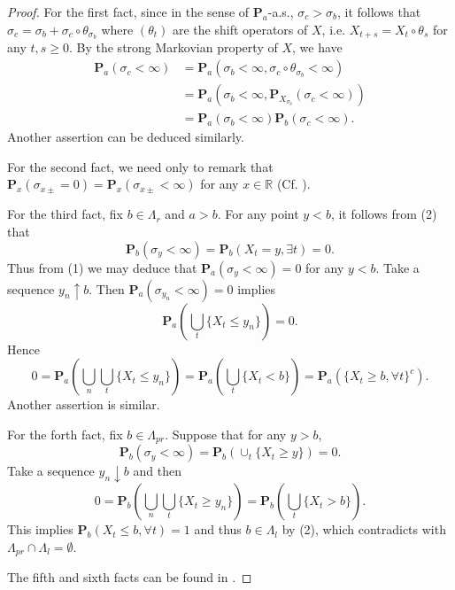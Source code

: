 \documentclass[a4paper]{amsart}
\theoremstyle{definition}
\theoremstyle{remark}
\numberwithin{equation}{section}
\begin{document}
\begin{proof}
For the first fact, since in the sense of $\mathbf{P}_a$-a.s., $\sigma_c>\sigma_b$, it follows that $\sigma_c=\sigma_b+\sigma_c\circ \theta_{\sigma_b}$ where $(\theta_t)$ are the shift operators of $X$, i.e. $X_{t+s}=X_t\circ \theta_s$ for any $t,s\geq 0$. By the strong Markovian property of $X$, we have
\[
\begin{aligned}
\mathbf{P}_a(\sigma_c<\infty)&= \mathbf{P}_a(\sigma_b<\infty, \sigma_c\circ \theta_{\sigma_b}<\infty)\\
&=\mathbf{P}_a(\sigma_b<\infty, \mathbf{P}_{X_{\sigma_b}}(\sigma_c<\infty))\\
&=\mathbf{P}_a(\sigma_b<\infty)\mathbf{P}_b(\sigma_c<\infty).
\end{aligned}
\]
Another assertion can be deduced similarly.

For the second fact, we need only to remark that $\mathbf{P}_x(\sigma_{x\pm}=0)=\mathbf{P}_x(\sigma_{x\pm}<\infty)$ for any $x\in \mathbb{R}$ (Cf. \cite[\S3.3, 10a)]{IM74}).

For the third fact, fix $b\in \Lambda_r$ and $a>b$. For any point $y<b$, it follows from (2) that
\[
\mathbf{P}_b(\sigma_y<\infty)=\mathbf{P}_b(X_t=y,\exists t)=0.
\]
Thus from (1) we may deduce that $\mathbf{P}_a(\sigma_y<\infty)=0$ for any $y<b$. Take a sequence $y_n\uparrow b$. Then $\mathbf{P}_a(\sigma_{y_n}<\infty)=0$ implies
\[
	\mathbf{P}_a\left(\bigcup_{t} \{X_t\leq y_n\}\right)=0.
\]
Hence
\[
	0=\mathbf{P}_a\left(\bigcup_n\bigcup_{t} \{X_t\leq y_n\}\right)=\mathbf{P}_a\left(\bigcup_t\{X_t<b\}\right)
	=\mathbf{P}_a\left(\{X_t\geq b, \forall t\}^c\right).
\]
Another assertion is similar.

For the forth fact, fix $b\in \Lambda_{pr}$. Suppose that for any $y>b$, $$\mathbf{P}_b(\sigma_y<\infty)=\mathbf{P}_b\left(\cup_t\{X_t\geq y\}\right)=0.$$ Take a sequence $y_n\downarrow b$ and then
\[
0=\mathbf{P}_b\left(\bigcup_n\bigcup_t\{X_t\geq y_n\}\right)=\mathbf{P}_b\left(\bigcup_t\{X_t>b\}\right).
\]
This implies $\mathbf{P}_b(X_t\leq b,\forall t)=1$ and thus $b\in \Lambda_l$ by (2), which contradicts with $\Lambda_{pr}\cap \Lambda_l=\emptyset$.

The fifth and sixth facts can be found in \cite[\S3.4]{IM74}.


\end{proof}
\end{document}
